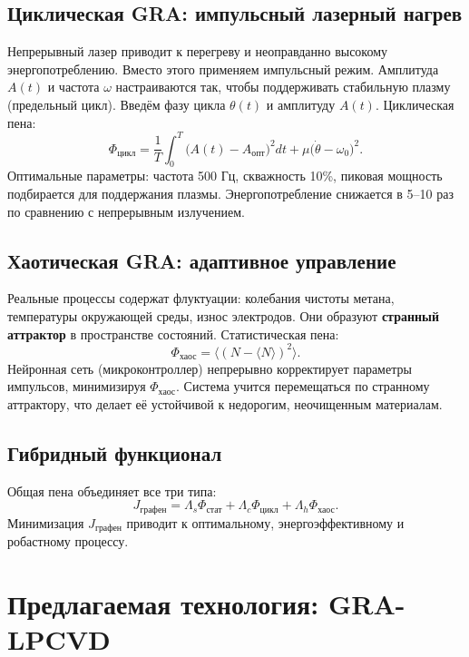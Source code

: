 \documentclass[12pt,a4paper]{article}
\begin{document}
\subsection{Циклическая GRA: импульсный лазерный нагрев}

Непрерывный лазер приводит к перегреву и неоправданно высокому энергопотреблению. Вместо этого применяем импульсный режим. Амплитуда \(A(t)\) и частота \(\omega\) настраиваются так, чтобы поддерживать стабильную плазму (предельный цикл). Введём фазу цикла \(\theta(t)\) и амплитуду \(A(t)\). Циклическая пена:
\[
\Phi_{\text{цикл}} = \frac{1}{T}\int_0^T \bigl(A(t)-A_{\text{опт}}\bigr)^2 dt + \mu \bigl(\dot{\theta} - \omega_0\bigr)^2.
\]
Оптимальные параметры: частота 500 Гц, скважность 10\%, пиковая мощность подбирается для поддержания плазмы. Энергопотребление снижается в 5–10 раз по сравнению с непрерывным излучением.

\subsection{Хаотическая GRA: адаптивное управление}

Реальные процессы содержат флуктуации: колебания чистоты метана, температуры окружающей среды, износ электродов. Они образуют \textbf{странный аттрактор} в пространстве состояний. Статистическая пена:
\[
\Phi_{\text{хаос}} = \bigl\langle (N - \langle N \rangle)^2 \bigr\rangle.
\]
Нейронная сеть (микроконтроллер) непрерывно корректирует параметры импульсов, минимизируя \(\Phi_{\text{хаос}}\). Система учится перемещаться по странному аттрактору, что делает её устойчивой к недорогим, неочищенным материалам.

\subsection{Гибридный функционал}

Общая пена объединяет все три типа:
\[
J_{\text{графен}} = \Lambda_s \Phi_{\text{стат}} + \Lambda_c \Phi_{\text{цикл}} + \Lambda_h \Phi_{\text{хаос}}.
\]
Минимизация \(J_{\text{графен}}\) приводит к оптимальному, энергоэффективному и робастному процессу.

\section{Предлагаемая технология: GRA-LPCVD}
\end{document}
